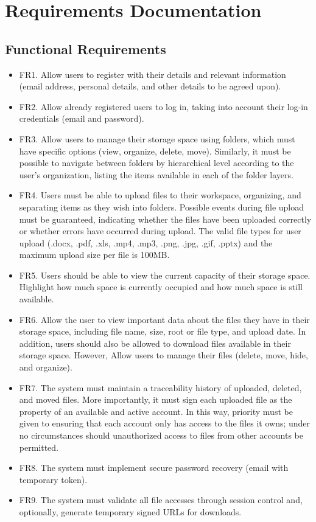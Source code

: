 \section{Requirements Documentation}
\subsection{Functional Requirements}
\begin{itemize}
    \item FR1. Allow users to register with their details and relevant information (email address, personal details, and other details to be agreed upon).
    \item FR2. Allow already registered users to log in, taking into account their log-in credentials (email and password).
    \item FR3. Allow users to manage their storage space using folders, which must have specific options (view, organize, delete, move). Similarly, it must be possible to navigate between folders by hierarchical level according to the user's organization, listing the items available in each of the folder layers.
    \item FR4. Users must be able to upload files to their workspace, organizing, and separating items as they wish into folders. Possible events during file upload must be guaranteed, indicating whether the files have been uploaded correctly or whether errors have occurred during upload. The valid file types for user upload (.docx, .pdf, .xls, .mp4, .mp3, .png, .jpg, .gif, .pptx) and the maximum upload size per file is 100MB.
    \item FR5. Users should be able to view the current capacity of their storage space. Highlight how much space is currently occupied and how much space is still available.
    \item FR6. Allow the user to view important data about the files they have in their storage space, including file name, size, root or file type, and upload date. In addition, users should also be allowed to download files available in their storage space.
    However, Allow users to manage their files (delete, move, hide, and organize).
    \item FR7. The system must maintain a traceability history of uploaded, deleted, and moved files. More importantly, it must sign each uploaded file as the property of an available and active account. In this way, priority must be given to ensuring that each account only has access to the files it owns; under no circumstances should unauthorized access to files from other accounts be permitted.
    \item FR8. The system must implement secure password recovery (email with temporary token).
    \item FR9. The system must validate all file accesses through session control and, optionally, generate temporary signed URLs for downloads.
\end{itemize}
